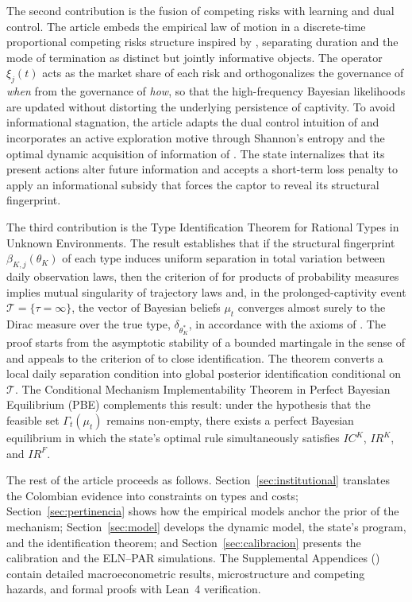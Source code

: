 \documentclass[ecta,nameyear,draft]{econsocart}
\theoremstyle{plain}
\theoremstyle{definition}
\newcommand{\1}{\mathbf{1}}
\newcommand{\Dirac}{\delta}
\begin{document}
The second contribution is the fusion of competing risks with learning and dual control. The article embeds the empirical law of motion in a discrete-time proportional competing risks structure inspired by \citet{Cox1972}, separating duration and the mode of termination as distinct but jointly informative objects. The operator $\xi_j(t)$ acts as the market share of each risk and orthogonalizes the governance of \emph{when} from the governance of \emph{how}, so that the high-frequency Bayesian likelihoods are updated without distorting the underlying persistence of captivity. To avoid informational stagnation, the article adapts the dual control intuition of \citet{Feldbaum1965} and incorporates an active exploration motive through Shannon's entropy \citet{Shannon1948} and the optimal dynamic acquisition of information of \citet{Zhong2022}. The state internalizes that its present actions alter future information and accepts a short-term loss penalty to apply an informational subsidy that forces the captor to reveal its structural fingerprint.

The third contribution is the Type Identification Theorem for Rational Types in Unknown Environments. The result establishes that if the structural fingerprint $\beta_{K,j}(\theta_K)$ of each type induces uniform separation in total variation between daily observation laws, then the criterion of \citet{Kakutani1948} for products of probability measures implies mutual singularity of trajectory laws and, in the prolonged-captivity event $\mathcal{T}=\{\tau=\infty\}$, the vector of Bayesian beliefs $\mu_t$ converges almost surely to the Dirac measure over the true type, $\Dirac_{\theta_K^\ast}$, in accordance with the axioms of \citet{BlackwellDubins1962}. The proof starts from the asymptotic stability of a bounded martingale in the sense of \citet{Doob1953Stochastic} and appeals to the criterion of \citet{Kakutani1948} to close identification. The theorem converts a local daily separation condition into global posterior identification conditional on $\mathcal{T}$. The Conditional Mechanism Implementability Theorem in Perfect Bayesian Equilibrium (PBE) complements this result: under the hypothesis that the feasible set $\Gamma_t(\mu_t)$ remains non-empty, there exists a perfect Bayesian equilibrium in which the state's optimal rule simultaneously satisfies $IC^K$, $IR^K$, and $IR^F$.

The rest of the article proceeds as follows. Section~\ref{sec:institutional} translates the Colombian evidence into constraints on types and costs; Section~\ref{sec:pertinencia} shows how the empirical models anchor the prior of the mechanism; Section~\ref{sec:model} develops the dynamic model, the state's program, and the identification theorem; and Section~\ref{sec:calibracion} presents the calibration and the ELN--PAR simulations. The Supplemental Appendices (\citet{BernalSupp1,BernalSupp2,BernalSupp3}) contain detailed macroeconometric results, microstructure and competing hazards, and formal proofs with Lean~4 verification.
\end{document}
